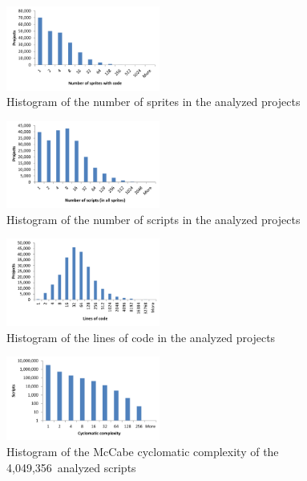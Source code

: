 \documentclass{sig-alternate}
\newcommand{\nscripts}{4,049,356}
\begin{document}
\begin{figure}
	\centering
	\includegraphics[width=0.45\textwidth]{fig/charts/1sprites}
	\caption{Histogram of the number of sprites in the analyzed projects}
	\label{fig:size-sprites}
\end{figure}
\begin{figure}
	\centering
	\includegraphics[width=0.45\textwidth]{fig/charts/1scripts}
	\caption{Histogram of the number of scripts in the analyzed projects}
	\label{fig:size-scripts}
\end{figure}
\begin{figure}
	\centering
	\includegraphics[width=0.45\textwidth]{fig/charts/1locs}
	\caption{Histogram of the lines of code in the analyzed projects}
	\label{fig:size-locs}
\end{figure}
\begin{figure}
	\centering
	\includegraphics[width=0.45\textwidth]{fig/charts/3cyclomatic}
	\caption{Histogram of the McCabe cyclomatic complexity of the \nscripts~analyzed scripts}
	\label{fig:cyclomatic}
\end{figure}
\end{document}
